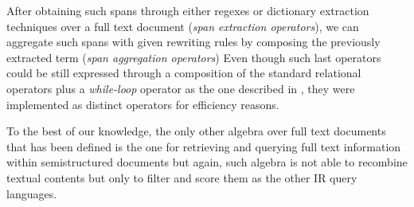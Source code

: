 After obtaining such spans through either regexes or dictionary extraction techniques over a full text document (\textit{span extraction operators}), we can aggregate such spans with given rewriting rules by composing the previously extracted term (\textit{span aggregation operators}) %
 Even though such last operators could be still expressed through a composition of the standard relational operators plus a \textit{while-loop}\index{$\lambda$} operator as the one described in \cite{Calders2006}, they were implemented as distinct operators for efficiency reasons.

To the best of our knowledge, the only other algebra over full text documents that has been defined is the one for retrieving and querying full text information within semistructured documents \cite{BurattiM07} but again, such algebra is not able to recombine textual contents but only to filter and score them as the other IR query languages.



